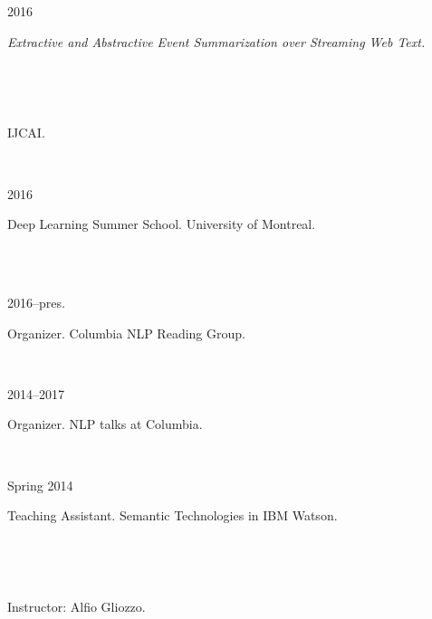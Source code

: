 \documentclass{scrartcl}
\newcommand{\MarginSection}[1]{\marginpar{#1}}
\begin{document}
\begin{cv}{}
{\noindent\parbox{6em}{2016}  \textit{Extractive and Abstractive Event Summarization over Streaming Web Text.}} \\
 {\noindent\parbox{6em}{~~~~} \noindent  IJCAI.}

~\\
\pagebreak

\MarginSection{~\\Summer\\Schools}

{\noindent\parbox{6em}{2016}  Deep Learning Summer School. University of Montreal.} \\ ~\\


\MarginSection{~\\Community\\Service}

{\noindent\parbox{6em}{2016--pres.}  Organizer. Columbia NLP Reading Group.} \\
{\noindent\parbox{6em}{2014--2017}  Organizer. NLP talks at Columbia.} \\
 

\MarginSection{~\\Teaching\\Experience}

{\noindent\parbox{6em}{Spring 2014}  Teaching Assistant. Semantic Technologies in IBM Watson.}\\
{\noindent\parbox{6em}{~~~~~~~~~~~}  Instructor: Alfio Gliozzo.}

~\\ ~\\


\end{cv}
\end{document}
